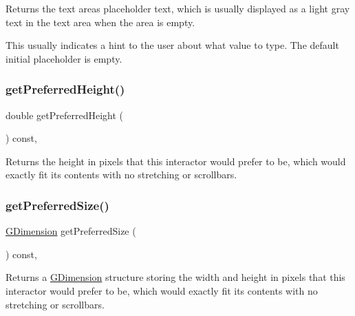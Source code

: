 Returns the text area\textquotesingle{}s placeholder text, which is usually displayed as a light gray text in the text area when the area is empty. 

This usually indicates a hint to the user about what value to type. The default initial placeholder is empty. \mbox{\label{classsgl_1_1GInteractor_a747de0961653847bdc6615dbf756d715}} 
\subsubsection{\texorpdfstring{get\+Preferred\+Height()}{getPreferredHeight()}}
{\footnotesize\ttfamily double get\+Preferred\+Height (\begin{DoxyParamCaption}{ }\end{DoxyParamCaption}) const\hspace{0.3cm}{\ttfamily [virtual]}, {\ttfamily [inherited]}}



Returns the height in pixels that this interactor would prefer to be, which would exactly fit its contents with no stretching or scrollbars. 

\mbox{\label{classsgl_1_1GInteractor_a4aabbee761d8e9116275401131b7ccd1}} 
\subsubsection{\texorpdfstring{get\+Preferred\+Size()}{getPreferredSize()}}
{\footnotesize\ttfamily \mbox{\hyperlink{structsgl_1_1GDimension}{G\+Dimension}} get\+Preferred\+Size (\begin{DoxyParamCaption}{ }\end{DoxyParamCaption}) const\hspace{0.3cm}{\ttfamily [virtual]}, {\ttfamily [inherited]}}



Returns a \mbox{\hyperlink{structsgl_1_1GDimension}{G\+Dimension}} structure storing the width and height in pixels that this interactor would prefer to be, which would exactly fit its contents with no stretching or scrollbars. 



